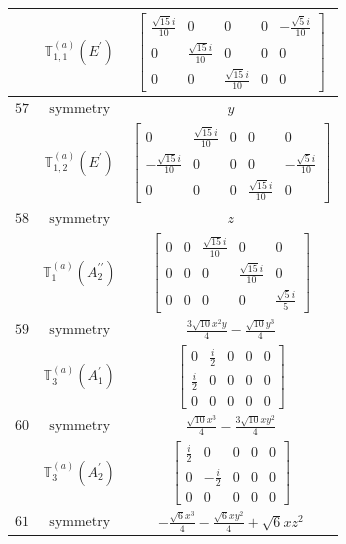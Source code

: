 \documentclass[fleqn,8pt,landscape]{jsarticle}
\begin{document}
\begin{longtable}{ccc}
$  $ & $ \mathbb{T}_{1,1}^{(a)}(E^{\prime}) $ & $ \begin{bmatrix} \frac{\sqrt{15} i}{10} & 0 & 0 & 0 & - \frac{\sqrt{5} i}{10} \\ 0 & \frac{\sqrt{15} i}{10} & 0 & 0 & 0 \\ 0 & 0 & \frac{\sqrt{15} i}{10} & 0 & 0 \end{bmatrix} $ \\ \hline
$ 57 $ & $ \text{symmetry} $ & $ y $ \\
$  $ & $ \mathbb{T}_{1,2}^{(a)}(E^{\prime}) $ & $ \begin{bmatrix} 0 & \frac{\sqrt{15} i}{10} & 0 & 0 & 0 \\ - \frac{\sqrt{15} i}{10} & 0 & 0 & 0 & - \frac{\sqrt{5} i}{10} \\ 0 & 0 & 0 & \frac{\sqrt{15} i}{10} & 0 \end{bmatrix} $ \\ \hline
$ 58 $ & $ \text{symmetry} $ & $ z $ \\
$  $ & $ \mathbb{T}_{1}^{(a)}(A_{2}^{\prime\prime}) $ & $ \begin{bmatrix} 0 & 0 & \frac{\sqrt{15} i}{10} & 0 & 0 \\ 0 & 0 & 0 & \frac{\sqrt{15} i}{10} & 0 \\ 0 & 0 & 0 & 0 & \frac{\sqrt{5} i}{5} \end{bmatrix} $ \\ \hline
$ 59 $ & $ \text{symmetry} $ & $ \frac{3 \sqrt{10} x^{2} y}{4} - \frac{\sqrt{10} y^{3}}{4} $ \\
$  $ & $ \mathbb{T}_{3}^{(a)}(A_{1}^{\prime}) $ & $ \begin{bmatrix} 0 & \frac{i}{2} & 0 & 0 & 0 \\ \frac{i}{2} & 0 & 0 & 0 & 0 \\ 0 & 0 & 0 & 0 & 0 \end{bmatrix} $ \\ \hline
$ 60 $ & $ \text{symmetry} $ & $ \frac{\sqrt{10} x^{3}}{4} - \frac{3 \sqrt{10} x y^{2}}{4} $ \\
$  $ & $ \mathbb{T}_{3}^{(a)}(A_{2}^{\prime}) $ & $ \begin{bmatrix} \frac{i}{2} & 0 & 0 & 0 & 0 \\ 0 & - \frac{i}{2} & 0 & 0 & 0 \\ 0 & 0 & 0 & 0 & 0 \end{bmatrix} $ \\ \hline
$ 61 $ & $ \text{symmetry} $ & $ - \frac{\sqrt{6} x^{3}}{4} - \frac{\sqrt{6} x y^{2}}{4} + \sqrt{6} x z^{2} $ \\

\end{longtable}
\end{document}
